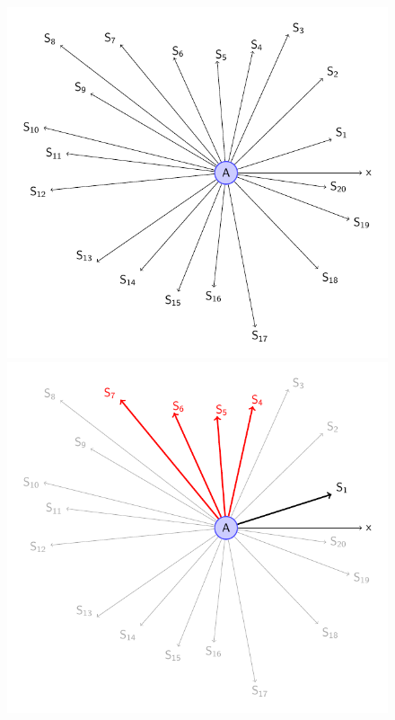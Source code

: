 \begin{figure}[h]
	\begin{minipage}{.3\linewidth}
		\includegraphics[scale=.5]{setSensors_1.pdf}
	\end{minipage}
	\hfill
	\begin{minipage}{.3\linewidth}
		\includegraphics[scale=.5]{setSensors_2.pdf}

\end{minipage}
\end{figure}
